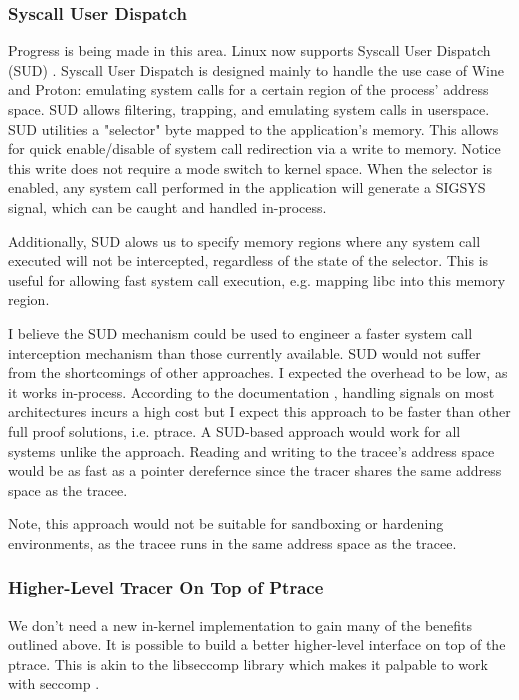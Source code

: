 \subsubsection{Syscall User Dispatch}
Progress is being made in this area. Linux now supports Syscall User Dispatch (SUD) \cite{sud}.
Syscall User Dispatch is designed mainly to handle the use case of Wine and Proton: emulating system calls for a certain region of the process' address space. SUD allows filtering, trapping, and emulating system calls in userspace. SUD utilities a "selector" byte mapped to the application's memory. This allows for quick enable/disable of system call redirection via a write to memory. Notice this write does not require a mode switch to kernel space. When the selector is enabled, any system call performed in the application will generate a SIGSYS signal, which can be caught and handled in-process. 

Additionally, SUD alows us to specify memory regions where any system call executed will not be intercepted, regardless of the state of the selector. This is useful for allowing fast system call execution, e.g. mapping libc into this memory region.

I believe the SUD mechanism could be used to engineer a faster system call interception mechanism than those currently available. SUD would not suffer from the shortcomings of other approaches. I expected the overhead to be low, as it works in-process. According to the documentation \cite{sud}, handling signals on most architectures incurs a high cost but I expect this approach to be faster than other full proof solutions, i.e. ptrace. A SUD-based approach would work for all systems unlike the  \ldpreload{} approach. Reading and writing to the tracee's address space would be as fast as a pointer derefernce since the tracer shares the same address space as the tracee.

Note, this approach would not be suitable for sandboxing or hardening environments, as the tracee runs in the same address space as the tracee.

\subsubsection{Higher-Level Tracer On Top of Ptrace} \label{sec:betterPtrace}
We don't need a new in-kernel implementation to gain many of the benefits outlined above. It is possible to build a better higher-level interface on top of the ptrace. This is akin to the libseccomp library which makes it palpable to work with seccomp \cite{libseccomp}.

